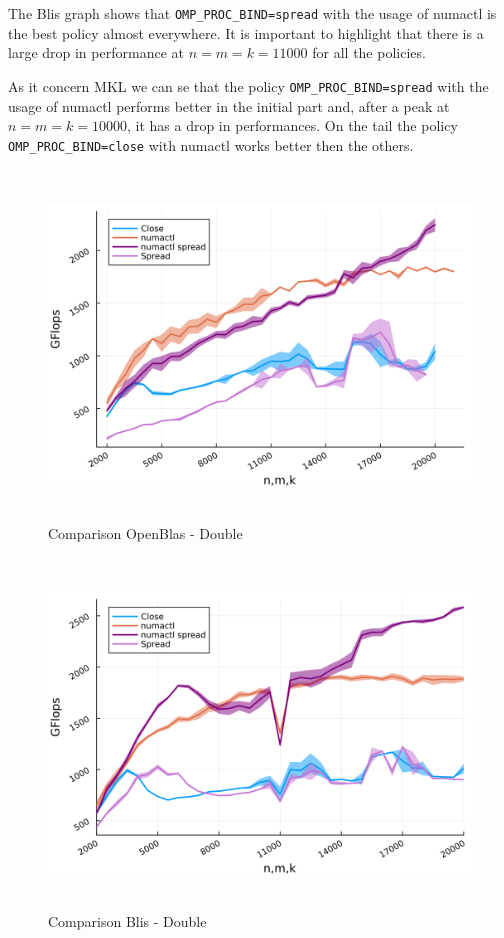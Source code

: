\documentclass[
  letterpaper,
  DIV=11,
  numbers=noendperiod]{scrartcl}
\begin{document}
The Blis graph shows that \texttt{OMP\_PROC\_BIND=spread} with the usage
of numactl is the best policy almost everywhere. It is important to
highlight that there is a large drop in performance at \(n=m=k=11000\)
for all the policies.

As it concern MKL we can se that the policy
\texttt{OMP\_PROC\_BIND=spread} with the usage of numactl performs
better in the initial part and, after a peak at \(n=m=k=10000\), it has
a drop in performances. On the tail the policy
\texttt{OMP\_PROC\_BIND=close} with numactl works better then the
others.

\begin{figure}

{\centering \includegraphics[width=\textwidth,height=3.64583in]{img/double_obblas_comparison.png}

}

\caption{Comparison OpenBlas - Double}

\end{figure}

\begin{figure}

{\centering \includegraphics[width=\textwidth,height=3.64583in]{img/double_blis_comparison.png}

}

\caption{Comparison Blis - Double}

\end{figure}
\end{document}
